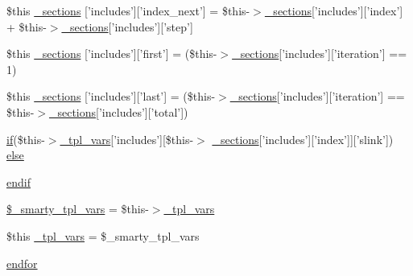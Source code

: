 \begin{DoxyCompactItemize}
\item 
\$this \hyperlink{34d6fa4bfd5eef6424a9ddc74a166350_2_06_06176_05_06_061767056382_05include_8tpl_8php_a12a0b78e177915fb4c6e0fe1e63d0a56}{\-\_\-sections} \mbox{[}'includes'\mbox{]}\mbox{[}'index\-\_\-next'\mbox{]} = \$this-\/$>$\hyperlink{_06_06127_05_06_0612781687_05pkgelementindex_8tpl_8php_a9e3d26b39edfe29c3f29b8035ef33828}{\-\_\-sections}\mbox{[}'includes'\mbox{]}\mbox{[}'index'\mbox{]} + \$this-\/$>$\hyperlink{_06_06127_05_06_0612781687_05pkgelementindex_8tpl_8php_a9e3d26b39edfe29c3f29b8035ef33828}{\-\_\-sections}\mbox{[}'includes'\mbox{]}\mbox{[}'step'\mbox{]}
\item 
\$this \hyperlink{34d6fa4bfd5eef6424a9ddc74a166350_2_06_06176_05_06_061767056382_05include_8tpl_8php_ae13052e9adab8b032ebf4a853a45daef}{\-\_\-sections} \mbox{[}'includes'\mbox{]}\mbox{[}'first'\mbox{]} = (\$this-\/$>$\hyperlink{_06_06127_05_06_0612781687_05pkgelementindex_8tpl_8php_a9e3d26b39edfe29c3f29b8035ef33828}{\-\_\-sections}\mbox{[}'includes'\mbox{]}\mbox{[}'iteration'\mbox{]} == 1)
\item 
\$this \hyperlink{34d6fa4bfd5eef6424a9ddc74a166350_2_06_06176_05_06_061767056382_05include_8tpl_8php_a8b4d7452d309e652903a1ef03f48f045}{\-\_\-sections} \mbox{[}'includes'\mbox{]}\mbox{[}'last'\mbox{]} = (\$this-\/$>$\hyperlink{_06_06127_05_06_0612781687_05pkgelementindex_8tpl_8php_a9e3d26b39edfe29c3f29b8035ef33828}{\-\_\-sections}\mbox{[}'includes'\mbox{]}\mbox{[}'iteration'\mbox{]} == \$this-\/$>$\hyperlink{_06_06127_05_06_0612781687_05pkgelementindex_8tpl_8php_a9e3d26b39edfe29c3f29b8035ef33828}{\-\_\-sections}\mbox{[}'includes'\mbox{]}\mbox{[}'total'\mbox{]})
\item 
\hyperlink{_setup_8inc_8php_ad0184337b31d13763ec8751feff4aabe}{if}(\$this-\/$>$\hyperlink{_06_06127_05_06_0612781687_05pkgelementindex_8tpl_8php_a4a4846d8e68d455590131a05697f67a3}{\-\_\-tpl\-\_\-vars}\mbox{[}'includes'\mbox{]}\mbox{[}\$this-\/$>$\*
\hyperlink{_06_06127_05_06_0612781687_05pkgelementindex_8tpl_8php_a9e3d26b39edfe29c3f29b8035ef33828}{\-\_\-sections}\mbox{[}'includes'\mbox{]}\mbox{[}'index'\mbox{]}\mbox{]}\mbox{[}'slink'\mbox{]}) \hyperlink{34d6fa4bfd5eef6424a9ddc74a166350_2_06_06176_05_06_061767056382_05include_8tpl_8php_a0fb34475c72dda38978dd1389cf315c8}{else}
\item 
\hyperlink{34d6fa4bfd5eef6424a9ddc74a166350_2_06_06176_05_06_061767056382_05include_8tpl_8php_a82cd33ca97ff99f2fcc5e9c81d65251b}{endif}
\item 
\hyperlink{34d6fa4bfd5eef6424a9ddc74a166350_2_06_06176_05_06_061767056382_05include_8tpl_8php_a14dde6d029d65a879ee7bc1ebc398dd1}{\$\-\_\-smarty\-\_\-tpl\-\_\-vars} = \$this-\/$>$\hyperlink{_06_06127_05_06_0612781687_05pkgelementindex_8tpl_8php_a4a4846d8e68d455590131a05697f67a3}{\-\_\-tpl\-\_\-vars}
\item 
\$this \hyperlink{34d6fa4bfd5eef6424a9ddc74a166350_2_06_06176_05_06_061767056382_05include_8tpl_8php_a4a4846d8e68d455590131a05697f67a3}{\-\_\-tpl\-\_\-vars} = \$\-\_\-smarty\-\_\-tpl\-\_\-vars
\item 
\hyperlink{34d6fa4bfd5eef6424a9ddc74a166350_2_06_06176_05_06_061767056382_05include_8tpl_8php_ae8fdc27183f296411bac00ed522ee1ac}{endfor}
\end{DoxyCompactItemize}


